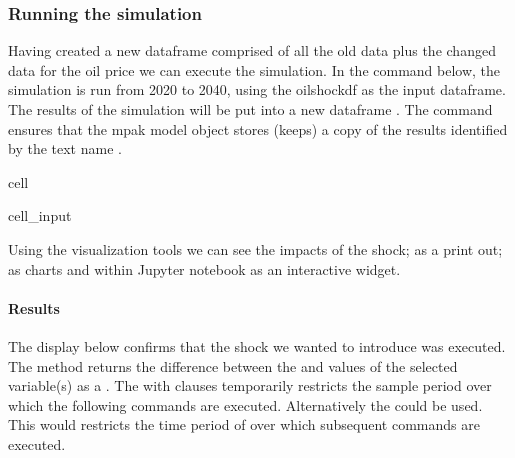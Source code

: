 \documentclass[letterpaper,10pt,english]{jupyterBook}
\begin{document}
\subsubsection{Running the simulation}
\label{\detokenize{content/06_WBModels/ScenarioAnalysis:running-the-simulation}}
\sphinxAtStartPar
Having created a new dataframe comprised of all the old data plus the changed data for the oil price we can execute the simulation.  In the command below, the simulation is run from 2020 to 2040, using the oilshockdf as the input dataframe.  The results of the simulation will be put into a new dataframe .  The  command ensures that the mpak model object stores (keeps) a copy of the results identified by the text name .

\begin{sphinxuseclass}{cell}\begin{sphinxVerbatimInput}

\begin{sphinxuseclass}{cell_input}
\begin{sphinxVerbatim}[commandchars=\\\{\}]
   
\end{sphinxVerbatim}

\end{sphinxuseclass}\end{sphinxVerbatimInput}

\end{sphinxuseclass}
\sphinxAtStartPar
Using the  visualization tools we can see the impacts of the shock; as a print out; as charts and within Jupyter notebook as an interactive widget.


\paragraph{Results}
\label{\detokenize{content/06_WBModels/ScenarioAnalysis:results}}
\sphinxAtStartPar
The display below confirms that the shock we wanted to introduce was executed. The  method returns the difference between the  and  values of the selected variable(s) as a . The with  clauses temporarily restricts the sample period over which the following  commands are executed.  Alternatively the could be used. This would restricts the time period of over which  subsequent commands are executed.
\end{document}
